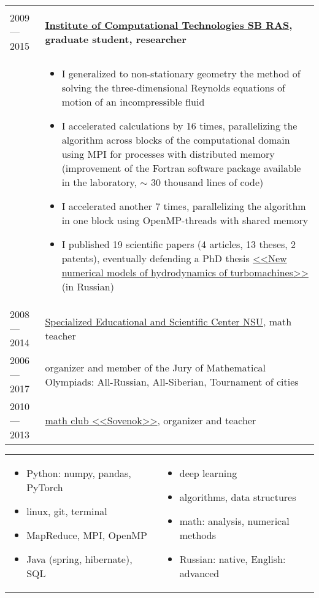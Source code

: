 \documentclass[11pt]{article}
\begin{document}
\begin{longtable} {l | p{}}
\begin{itemize}
\end{itemize}
\\
2009 — 2015 & {\textbf{\href{http://www.ict.nsc.ru/en}{Institute of Computational Technologies SB RAS}, graduate student, researcher}}\\
& \vspace{-1.5em} \begin{itemize}
	\item I generalized to non-stationary geometry the method of solving the three-dimensional Reynolds equations of motion of an incompressible fluid
	\item I accelerated calculations by 16 times, parallelizing the algorithm across blocks of the computational domain using MPI for processes with distributed memory (improvement of the Fortran software package available in the laboratory, $\sim$ 30 thousand lines of code)
	\item I accelerated another 7 times, parallelizing the algorithm in one block using OpenMP-threads with shared memory
	\item I published 19 scientific papers (4 articles, 13 theses, 2 patents), eventually defending a PhD thesis \href{https://github.com/avalur/dissertation/blob/master/to_print/autoref_Avdyushenko.pdf}{<<New numerical models of hydrodynamics of turbomachines>>} (in Russian)
\end{itemize}
\\

2008 — 2014 & {\href{http://sesc.nsu.ru}{Specialized Educational and Scientific Center NSU}, math teacher}\\
2006 — 2017 & {organizer and member of the Jury of Mathematical Olympiads: All-Russian, All-Siberian, Tournament of cities}\\
2010 — 2013 & {\href{https://www.sovenok.academy/}{math club <<Sovenok>>}, organizer and teacher}\\
\end{longtable}

\newpage
{}
\begin{longtable} {p{}p{}}
\vspace{-2em}
\begin{itemize}
	\item Python: numpy, pandas, PyTorch
	\item linux, git, terminal
	\item MapReduce, MPI, OpenMP
	\item Java (spring, hibernate), SQL
\end{itemize}
&
\vspace{-2em}
\begin{itemize}
	\item deep learning
	\item algorithms, data structures
	\item math: analysis, numerical methods
	\item Russian: native, English: advanced
\end{itemize}
\end{longtable}
\end{document}
